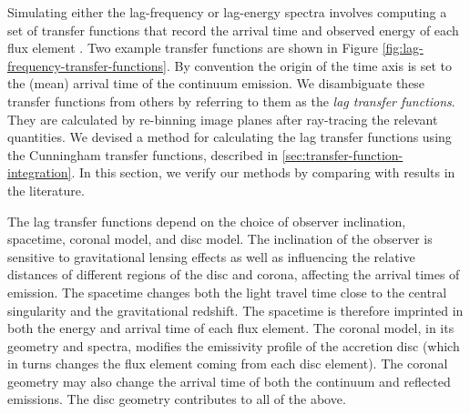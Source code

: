 \documentclass[fleqn,usenatbib]{mnras}
\begin{document}
Simulating either the lag-frequency or lag-energy spectra involves computing a
set of transfer functions that record the arrival time and observed energy of
each flux element \citep{reynolds_x-ray_1999}. Two example transfer functions are shown in Figure
\ref{fig:lag-frequency-transfer-functions}. By convention the
origin of the time axis is set to the (mean) arrival time of the continuum
emission. We disambiguate these transfer functions from others by referring to
them as the \textit{lag transfer functions}. They are calculated by re-binning
image planes after ray-tracing the relevant quantities. We devised a method for
calculating the lag transfer functions using the Cunningham transfer functions,
described in \ref{sec:transfer-function-integration}. In this section, we verify
our methods by comparing with results in the literature.

The lag transfer functions depend on the choice of observer inclination,
spacetime, coronal model, and disc model. The inclination of the observer is
sensitive to gravitational lensing effects as well as influencing the relative
distances of different regions of the disc and corona, affecting the arrival
times of emission. The spacetime changes both the light travel time close to the
central singularity and the gravitational redshift. The spacetime is therefore
imprinted in both the energy and arrival time of each flux element.  The coronal
model, in its geometry and spectra, modifies the emissivity profile of the
accretion disc (which in turns changes the flux element coming from each disc
element). The coronal geometry may also change the arrival time of both the
continuum and reflected emissions. The disc geometry contributes to all of the
above.

\end{document}
